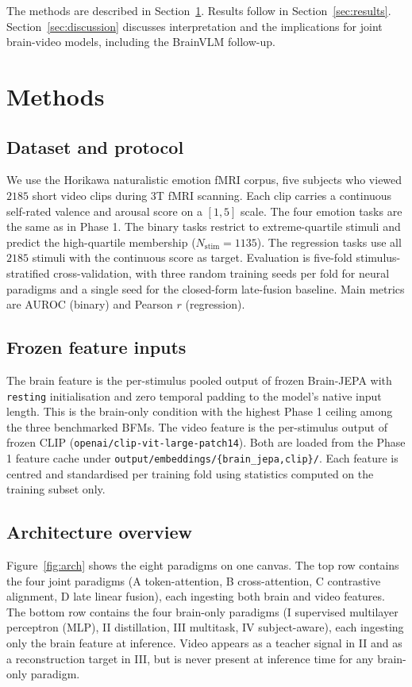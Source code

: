 \documentclass[11pt, a4paper]{article}
\newcommand{\fefn}[1]{\texttt{\small #1}}
\begin{document}
The methods are described in Section~\ref{sec:methods}. Results follow in
Section~\ref{sec:results}. Section~\ref{sec:discussion} discusses interpretation and the
implications for joint brain-video models, including the BrainVLM follow-up.

\section{Methods}
\label{sec:methods}

\subsection{Dataset and protocol}
We use the Horikawa naturalistic emotion fMRI corpus, five subjects who viewed $2185$
short video clips during 3T fMRI scanning. Each clip carries a continuous self-rated
valence and arousal score on a $[1, 5]$ scale. The four emotion tasks are the same as in
Phase 1. The binary tasks restrict to extreme-quartile stimuli and predict the
high-quartile membership ($N_{\text{stim}} = 1135$). The regression tasks use all $2185$
stimuli with the continuous score as target. Evaluation is five-fold
stimulus-stratified cross-validation, with three random training seeds per fold for
neural paradigms and a single seed for the closed-form late-fusion baseline. Main metrics
are AUROC (binary) and Pearson $r$ (regression).

\subsection{Frozen feature inputs}
The brain feature is the per-stimulus pooled output of frozen Brain-JEPA with
\fefn{resting} initialisation and zero temporal padding to the model's native input
length. This is the brain-only condition with the highest Phase 1 ceiling among the three
benchmarked BFMs. The video feature is the per-stimulus output of frozen CLIP
(\fefn{openai/clip-vit-large-patch14}). Both are loaded from the Phase 1 feature cache
under \fefn{output/embeddings/\{brain\_jepa,clip\}/}. Each feature is centred and
standardised per training fold using statistics computed on the training subset only.

\subsection{Architecture overview}
Figure~\ref{fig:arch} shows the eight paradigms on one canvas. The top row contains the
four joint paradigms (A token-attention, B cross-attention, C contrastive alignment, D
late linear fusion), each ingesting both brain and video features. The bottom row
contains the four brain-only paradigms (I supervised multilayer perceptron (MLP), II
distillation, III multitask, IV subject-aware), each ingesting only the brain feature at
inference. Video appears as a teacher signal in II and as a reconstruction target in III,
but is never present at inference time for any brain-only paradigm.
\end{document}
